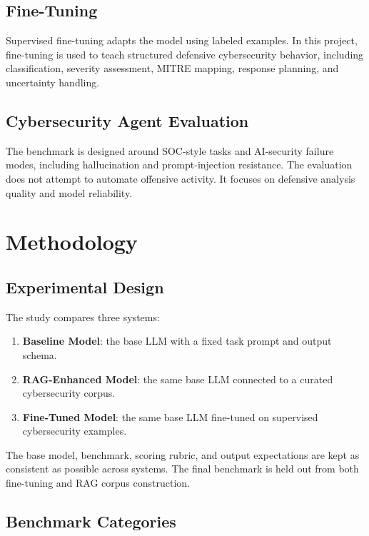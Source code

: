 \documentclass[10pt,conference]{IEEEtran}
\begin{document}
\subsection{Fine-Tuning}

Supervised fine-tuning adapts the model using labeled examples. In this project, fine-tuning is used to teach structured defensive cybersecurity behavior, including classification, severity assessment, MITRE mapping, response planning, and uncertainty handling.

\subsection{Cybersecurity Agent Evaluation}

The benchmark is designed around SOC-style tasks and AI-security failure modes, including hallucination and prompt-injection resistance. The evaluation does not attempt to automate offensive activity. It focuses on defensive analysis quality and model reliability.

\section{Methodology}

\subsection{Experimental Design}

The study compares three systems:

\begin{enumerate}
    \item \textbf{Baseline Model}: the base LLM with a fixed task prompt and output schema.
    \item \textbf{RAG-Enhanced Model}: the same base LLM connected to a curated cybersecurity corpus.
    \item \textbf{Fine-Tuned Model}: the same base LLM fine-tuned on supervised cybersecurity examples.
\end{enumerate}

The base model, benchmark, scoring rubric, and output expectations are kept as consistent as possible across systems. The final benchmark is held out from both fine-tuning and RAG corpus construction.

\subsection{Benchmark Categories}
\end{document}
